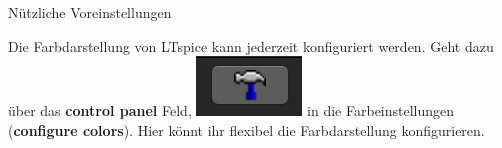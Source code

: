 \documentclass{beamer}
\begin{document}
\begin{frame}[fragile]{Nützliche Voreinstellungen}	

Die Farbdarstellung von LTspice kann jederzeit konfiguriert werden. Geht dazu über das 
\textbf{control panel} Feld, \includegraphics[scale=0.5]{pictures/controlpanel.png} in die Farbeinstellungen
(\textbf{configure colors}). Hier könnt ihr flexibel die Farbdarstellung konfigurieren.

\begin{figure}
  \centering
  \qquad    
\end{figure}

\end{frame}
\end{document}
